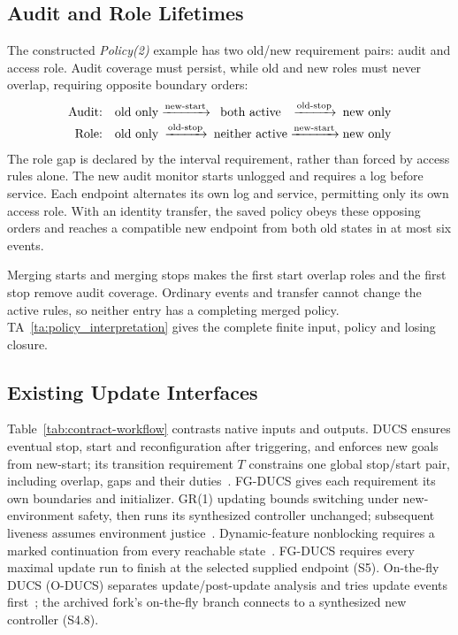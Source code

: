 \documentclass[acmsmall,screen,review,anonymous]{acmart}
\begin{document}
\subsection{Audit and Role Lifetimes}
The constructed \emph{Policy(2)} example has two old/new requirement pairs: audit and access role. Audit coverage must persist, while old and new roles must never overlap, requiring opposite boundary orders:
\[
\begin{array}{r@{\quad}c@{\;}c@{\;}c@{\;}c@{\;}c}
\text{Audit:}&\text{old only}&\xrightarrow{\text{new-start}}&\text{both active}&\xrightarrow{\text{old-stop}}&\text{new only}\\[2pt]
\text{Role:}&\text{old only}&\xrightarrow{\text{old-stop}}&\text{neither active}&\xrightarrow{\text{new-start}}&\text{new only}
\end{array}
\]
The role gap is declared by the interval requirement, rather than forced by access rules alone. The new audit monitor starts unlogged and requires a log before service. Each endpoint alternates its own log and service, permitting only its own access role. With an identity transfer, the saved policy obeys these opposing orders and reaches a compatible new endpoint from both old states in at most six events.

Merging starts and merging stops makes the first start overlap roles and the first stop remove audit coverage. Ordinary events and transfer cannot change the active rules, so neither entry has a completing merged policy. TA~\ref{ta:policy_interpretation} gives the complete finite input, policy and losing closure.

\subsection{Existing Update Interfaces}
\label{sec:ducs-cell-construction}

Table~\ref{tab:contract-workflow} contrasts native inputs and outputs. DUCS ensures eventual stop, start and reconfiguration after triggering, and enforces new goals from new-start; its transition requirement $T$ constrains one global stop/start pair, including overlap, gaps and their duties~\cite[Def.~4.1]{Nahabedian2020}. FG-DUCS gives each requirement its own boundaries and initializer. GR(1) updating bounds switching under new-environment safety, then runs its synthesized controller unchanged; subsequent liveness assumes environment justice~\cite[Def.~3.1, Sec.~4]{Amram2022GR1DynamicUpdate}. Dynamic-feature nonblocking requires a marked continuation from every reachable state~\cite[Sec.~7]{ThuijsmanReniers2024DynamicFeature}. FG-DUCS requires every maximal update run to finish at the selected supplied endpoint (S5). On-the-fly DUCS (O-DUCS) separates update/post-update analysis and tries update events first~\cite[Secs.~2--3]{HiranoEtAl2024ODUCS}; the archived fork's on-the-fly branch connects to a synthesized new controller (S4.8).
\end{document}
